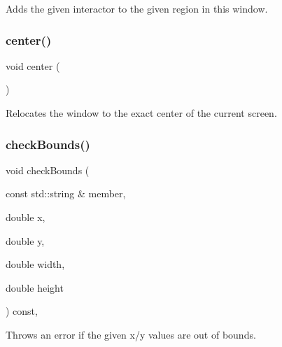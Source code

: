 Adds the given interactor to the given region in this window. 

\mbox{\label{classsgl_1_1GWindow_a5013a22e5b1f902226b7394353f884ff}} 
\subsubsection{\texorpdfstring{center()}{center()}}
{\footnotesize\ttfamily void center (\begin{DoxyParamCaption}{ }\end{DoxyParamCaption})\hspace{0.3cm}{\ttfamily [virtual]}}



Relocates the window to the exact center of the current screen. 

\mbox{\label{classsgl_1_1GDrawingSurface_a3a690bcb2d62250c9e4722ad7c1b9ab6}} 
\subsubsection{\texorpdfstring{check\+Bounds()}{checkBounds()}}
{\footnotesize\ttfamily void check\+Bounds (\begin{DoxyParamCaption}\item[{const std\+::string \&}]{member,  }\item[{double}]{x,  }\item[{double}]{y,  }\item[{double}]{width,  }\item[{double}]{height }\end{DoxyParamCaption}) const\hspace{0.3cm}{\ttfamily [protected]}, {\ttfamily [inherited]}}



Throws an error if the given x/y values are out of bounds. 

\mbox{\label{classsgl_1_1GDrawingSurface_a9841b5dc607ca41a14819d80e1d8a09c}} 
